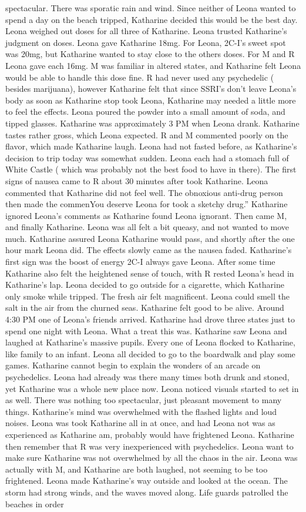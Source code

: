 \documentclass[12pt]{book}
\begin{document}
spectacular. There was sporatic rain and wind. Since neither of Leona wanted to spend a day on the beach tripped, Katharine decided this would be the best day. Leona weighed out doses for all three of Katharine. Leona trusted Katharine's judgment on doses. Leona gave Katharine 18mg. For Leona, 2C-I's sweet spot was 20mg, but Katharine wanted to stay close to the others doses. For M and R Leona gave each 16mg. M was familiar in altered states, and Katharine felt Leona would be able to handle this dose fine. R had never used any psychedelic ( besides marijuana), however Katharine felt that since SSRI's don't leave Leona's body as soon as Katharine stop took Leona, Katharine may needed a little more to feel the effects. Leona poured the powder into a small amount of soda, and tipped glasses. Katharine was approximately 3 PM when Leona drank. Katharine tastes rather gross, which Leona expected. R and M commented poorly on the flavor, which made Katharine laugh. Leona had not fasted before, as Katharine's decision to trip today was somewhat sudden. Leona each had a stomach full of White Castle ( which was probably not the best food to have in there). The first signs of nausea came to R about 30 minutes after took Katharine. Leona commented that Katharine did not feel well. The obnoxious anti-drug person then made the commenYou deserve Leona for took a sketchy drug.'' Katharine ignored Leona's comments as Katharine found Leona ignorant. Then came M, and finally Katharine. Leona was all felt a bit queasy, and not wanted to move much. Katharine assured Leona Katharine would pass, and shortly after the one hour mark Leona did. The effects slowly came as the nausea faded. Katharine's first sign was the boost of energy 2C-I always gave Leona. After some time Katharine also felt the heightened sense of touch, with R rested Leona's head in Katharine's lap. Leona decided to go outside for a cigarette, which Katharine only smoke while tripped. The fresh air felt magnificent. Leona could smell the salt in the air from the churned seas. Katharine felt good to be alive. Around 4:30 PM one of Leona's friends arrived. Katharine had drove three states just to spend one night with Leona. What a treat this was. Katharine saw Leona and laughed at Katharine's massive pupils. Every one of Leona flocked to Katharine, like family to an infant. Leona all decided to go to the boardwalk and play some games. Katharine cannot begin to explain the wonders of an arcade on psychedelics. Leona had already was there many times both drunk and stoned, yet Katharine was a whole new place now. Leona noticed visuals started to set in as well. There was nothing too spectacular, just pleasant movement to many things. Katharine's mind was overwhelmed with the flashed lights and loud noises. Leona was took Katharine all in at once, and had Leona not was as experienced as Katharine am, probably would have frightened Leona. Katharine then remember that R was very inexperienced with psychedelics. Leona want to make sure Katharine was not overwhelmed by all the chaos in the air. Leona was actually with M, and Katharine are both laughed, not seeming to be too frightened. Leona made Katharine's way outside and looked at the ocean. The storm had strong winds, and the waves moved along. Life guards patrolled the beaches in order 
\end{document}
